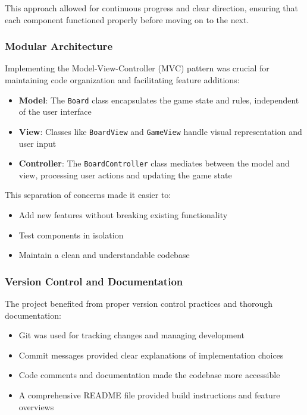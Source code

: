 This approach allowed for continuous progress and clear direction, ensuring that each component functioned properly before moving on to the next.

\subsubsection{Modular Architecture}
Implementing the Model-View-Controller (MVC) pattern was crucial for maintaining code organization and facilitating feature additions:

\begin{itemize}
    \item \textbf{Model}: The \texttt{Board} class encapsulates the game state and rules, independent of the user interface
    \item \textbf{View}: Classes like \texttt{BoardView} and \texttt{GameView} handle visual representation and user input
    \item \textbf{Controller}: The \texttt{BoardController} class mediates between the model and view, processing user actions and updating the game state
\end{itemize}

This separation of concerns made it easier to:
\begin{itemize}
    \item Add new features without breaking existing functionality
    \item Test components in isolation
    \item Maintain a clean and understandable codebase
\end{itemize}

\subsubsection{Version Control and Documentation}
The project benefited from proper version control practices and thorough documentation:

\begin{itemize}
    \item Git was used for tracking changes and managing development
    \item Commit messages provided clear explanations of implementation choices
    \item Code comments and documentation made the codebase more accessible
    \item A comprehensive README file provided build instructions and feature overviews
\end{itemize}

